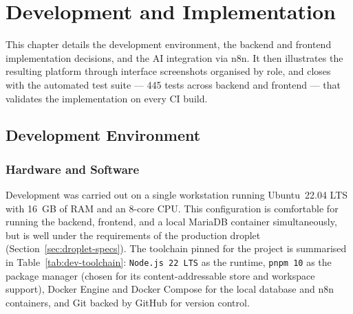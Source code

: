\documentclass[12pt, a4paper, oneside]{report}
\newenvironment{chapterintro}{%
  \begin{mdframed}[backgroundcolor=cheebolightgray,linecolor=cheeboblue,linewidth=1pt]
  \small\itshape
}{%
  \end{mdframed}
}
\begin{document}
\chapter{Development and Implementation}

\begin{chapterintro}
  This chapter details the development environment, the backend and
  frontend implementation decisions, and the AI integration via n8n.
  It then illustrates the resulting platform through interface
  screenshots organised by role, and closes with the automated test
  suite --- 445 tests across backend and frontend --- that validates
  the implementation on every CI build.
\end{chapterintro}

\section{Development Environment}

\subsection{Hardware and Software}

Development was carried out on a single workstation running
Ubuntu~22.04 LTS with 16~GB of RAM and an 8-core CPU. This
configuration is comfortable for running the backend, frontend, and a
local MariaDB container simultaneously, but is well under the
requirements of the production droplet (Section~\ref{sec:droplet-specs}).
The toolchain pinned for the project is summarised in
Table~\ref{tab:dev-toolchain}: \texttt{Node.js 22 LTS} as the runtime,
\texttt{pnpm 10} as the package manager (chosen for its
content-addressable store and workspace support), Docker Engine and
Docker Compose for the local database and n8n containers, and Git
backed by GitHub for version control.
\end{document}
